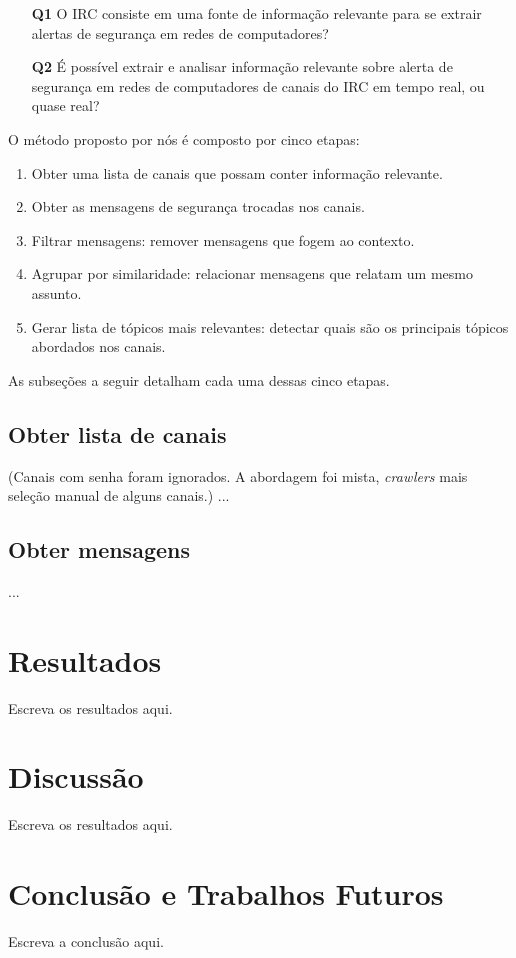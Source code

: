 \documentclass[12pt]{article}
\begin{document}
\begin{itemize}
	\item[\textbf{Q1}] O IRC consiste em uma fonte de informação relevante para se
	extrair alertas de segurança em redes de computadores?
	\item[\textbf{Q2}] É possível extrair e analisar informação relevante sobre alerta
	de segurança em redes de computadores de canais do IRC em tempo real, ou 
	quase real?
\end{itemize}

O método proposto por nós é composto por cinco etapas:

\begin{enumerate}

	\item Obter uma lista de canais que possam conter informação relevante.
	\item Obter as mensagens de segurança trocadas nos canais.
	\item Filtrar mensagens: remover mensagens que fogem ao contexto.
	\item Agrupar por similaridade: relacionar mensagens que relatam um mesmo
	assunto.
	\item Gerar lista de tópicos mais relevantes: detectar quais são os
	principais tópicos abordados nos canais.
\end{enumerate}

As subseções a seguir detalham cada uma dessas cinco etapas.

\subsection{Obter lista de canais}

(Canais com senha foram ignorados. A abordagem foi mista, \textit{crawlers}
mais seleção manual de alguns canais.) ...

\subsection{Obter mensagens}

...

\section{Resultados} \label{sec:res}

Escreva os resultados aqui.

\section{Discussão} \label{sec:disc}

Escreva os resultados aqui.


\section{Conclusão e Trabalhos Futuros} \label{sec: concl}

Escreva a conclusão aqui.



\end{document}
